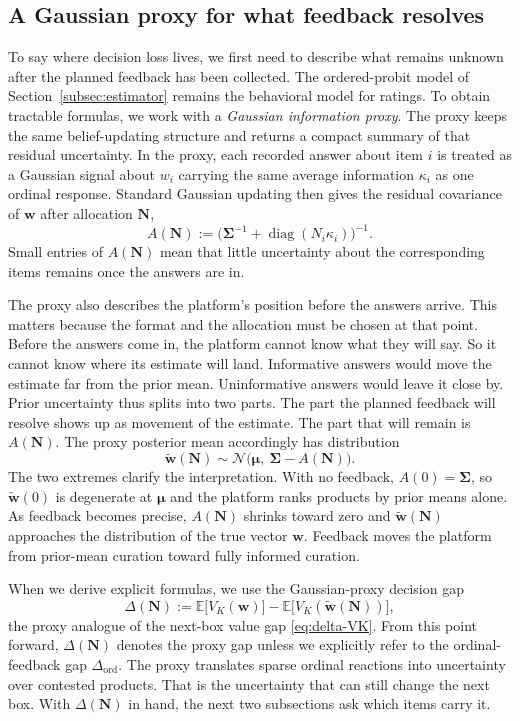 \documentclass[11pt]{article}
\theoremstyle{definition}
\theoremstyle{remark}
\newcommand{\E}{\mathbb{E}}
\newcommand{\1}{\mathbf{1}}
\newcommand{\w}{\mathbf{w}}
\newcommand{\bmu}{\boldsymbol{\mu}}
\newcommand{\bSigma}{\boldsymbol{\Sigma}}
\newcommand{\N}{\mathbf{N}}
\begin{document}
\subsection{A Gaussian proxy for what feedback resolves}
\label{subsec:proxy}

To say where decision loss lives, we first need to describe what
remains unknown after the planned feedback has been collected. The
ordered-probit model of Section~\ref{subsec:estimator} remains the
behavioral model for ratings. To obtain tractable formulas, we work with a
\emph{Gaussian information proxy}. The proxy keeps the same belief-updating structure and returns a compact
summary of that residual uncertainty. In the proxy, each recorded answer about item \(i\) is treated as a
Gaussian signal about \(w_i\) carrying the same average information
\(\kappa_i\) as one ordinal response. Standard Gaussian updating then gives the residual covariance of \(\w\) after allocation \(\N\),
\[
A(\N):=\big(\bSigma^{-1}+\operatorname{diag}(N_i\kappa_i)\big)^{-1}.
\]
Small entries of \(A(\N)\) mean that little uncertainty about the
corresponding items remains once the answers are in.

The proxy also describes the platform's position before the answers
arrive. This matters because the format and the allocation must be
chosen at that point. Before the answers come in, the platform cannot
know what they will say. So it cannot know where its estimate will
land. Informative answers would move the estimate far from the prior
mean. Uninformative answers would leave it close by. Prior uncertainty
thus splits into two parts. The part the planned feedback will resolve
shows up as movement of the estimate. The part that will remain is
\(A(\N)\). The proxy posterior mean accordingly has distribution
\[
\tilde{\w}(\N) \sim
\mathcal N\!\big(\bmu,\ \bSigma - A(\N)\big).
\]
The two extremes clarify the interpretation. With no feedback,
\(A(0)=\bSigma\), so \(\tilde{\w}(0)\) is degenerate at \(\bmu\) and
the platform ranks products by prior means alone. As feedback becomes
precise, \(A(\N)\) shrinks toward zero and \(\tilde{\w}(\N)\)
approaches the distribution of the true vector \(\w\). Feedback moves
the platform from prior-mean curation toward fully informed curation.

When we derive explicit formulas, we use the Gaussian-proxy decision
gap
\begin{equation}\label{eq:delta-proxy}
\Delta(\N)
:=
\E\!\big[V_K(\w)\big]-\E\!\big[V_K(\tilde{\w}(\N))\big],
\end{equation}
the proxy analogue of the next-box value gap \eqref{eq:delta-VK}. From
this point forward, \(\Delta(\N)\) denotes the proxy gap unless we
explicitly refer to the ordinal-feedback gap \(\Delta_{\mathrm{ord}}\).
The proxy translates sparse ordinal reactions into uncertainty over
contested products. That is the uncertainty that can still change the
next box. With \(\Delta(\N)\) in hand, the next two subsections ask
which items carry it.
\end{document}
